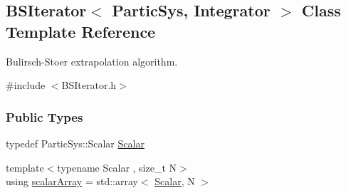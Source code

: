 \hypertarget{class_b_s_iterator}{}\subsection{B\+S\+Iterator$<$ Partic\+Sys, Integrator $>$ Class Template Reference}
\label{class_b_s_iterator}


Bulirsch-\/\+Stoer extrapolation algorithm.  




{\ttfamily \#include $<$B\+S\+Iterator.\+h$>$}

\subsubsection*{Public Types}
\begin{DoxyCompactItemize}
\item 
typedef Partic\+Sys\+::\+Scalar \mbox{\hyperlink{class_b_s_iterator_a7857f8ff9032955ea4dcc22cd18ca7a1}{Scalar}}
\item 
{\footnotesize template$<$typename Scalar , size\+\_\+t N$>$ }\\using \mbox{\hyperlink{class_b_s_iterator_ab0aa7c10b56500273af05dcd85fd8389}{scalar\+Array}} = std\+::array$<$ \mbox{\hyperlink{class_b_s_iterator_a7857f8ff9032955ea4dcc22cd18ca7a1}{Scalar}}, N $>$
\end{DoxyCompactItemize}
